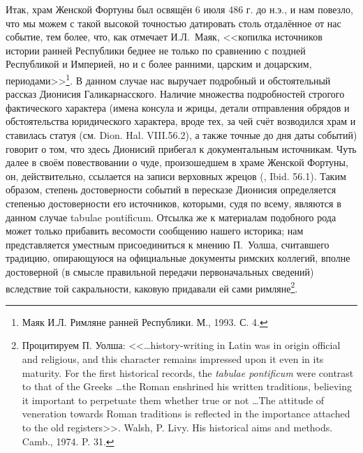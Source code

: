 Итак, храм Женской Фортуны был освящён 6 июля 486 г. до н.э., и нам повезло, что мы можем с такой высокой точностью датировать столь отдалённое от нас событие, тем более, что, как отмечает И.Л.~Маяк, <<копилка источников истории ранней Республики беднее не только по сравнению с поздней Республикой и Империей, но и с более ранними, царским и доцарским, периодами>>\footnote{Маяк И.Л. Римляне ранней Республики. М., 1993. С. 4.}. В данном случае нас выручает подробный и обстоятельный рассказ Дионисия Галикарнасского. Наличие множества подробностей строгого фактического характера (имена консула и жрицы, детали отправления обрядов и обстоятельства юридического характера, вроде тех, за чей счёт возводился храм и ставилась статуя (см. Dion. Hal. VIII.56.2), а также точные до дня даты событий) говорит о том, что здесь Дионисий прибегал к документальным источникам. Чуть далее в своём повествовании о чуде, произошедшем в храме Женской Фортуны, он, действительно, ссылается на записи верховных жрецов (, Ibid. 56.1). Таким образом, степень достоверности событий в пересказе Дионисия определяется степенью достоверности его источников, которыми, судя по всему, являются в данном случае tabulae pontificum. Отсылка же к материалам подобного рода может только прибавить весомости сообщению нашего историка; нам представляется уместным присоединиться к мнению П.~Уолша, считавшего традицию, опирающуюся на официальные документы римских коллегий, вполне достоверной (в смысле правильной передачи первоначальных сведений) вследствие той сакральности, каковую придавали ей сами римляне\footnote{\label{WalshRegistersQuote}Процитируем П. Уолша: <<\ldots history-writing in Latin was in origin official and religious, and this character remains impressed upon it even in its maturity. For the first historical records, the \textit{tabulae pontificum} were contrast to that of the Greeks \ldots the Roman enshrined his written traditions, believing it important to perpetuate them whether true or not \ldots The attitude of veneration towards Roman traditions is reflected in the importance attached to the old registers>>. Walsh, P. Livy. His historical aims and methods. Camb., 1974. P. 31.}.


